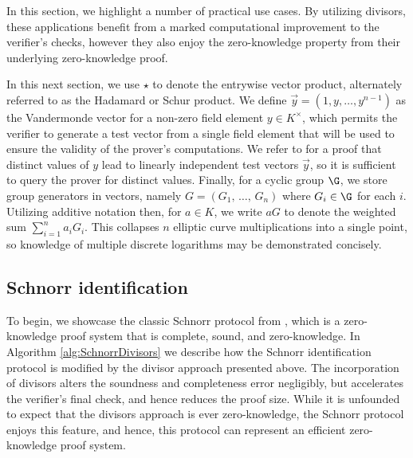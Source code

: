 \documentclass[11pt,letterpaper]{article}
\theoremstyle{definition}
\newcommand{\6}{\mathbf}
\newcommand{\7}{\mathcal}
\newcommand{\lsamp}{\xleftarrow{\$}}
\begin{document}
In this section, we highlight a number of practical use cases. By utilizing divisors, these applications benefit from a marked computational improvement to the verifier's checks, however they also enjoy the zero-knowledge property from their underlying zero-knowledge proof.

In this next section, we use $\star$ to denote the entrywise vector product, alternately referred to as the Hadamard or Schur product. 
We define $\vec{y} = (1, y, \dots, y^{n-1})$ as the Vandermonde vector for a non-zero field element $y \in K^\times$, which permits the verifier to generate a test vector from a single field element that will be used to ensure the validity of the prover's computations.  
We refer to \cite{HammR} for a proof that distinct values of $y$ lead to linearly independent test vectors $\vec{y}$, so it is sufficient to query the prover for distinct values.
Finally, for a cyclic group $\G$, we store group generators in vectors, namely $G = (G_1, \, \dots, \, G_n)$ where $G_i \in \G$ for each $i$.
Utilizing additive notation then, for $a \in K$, we write $a G$ to denote the weighted sum $\sum_{i=1}^n a_i G_i$. 
This collapses $n$ elliptic curve multiplications into a single point, so knowledge of multiple discrete logarithms may be demonstrated concisely.







\subsection{Schnorr identification}

To begin, we showcase the classic Schnorr protocol from \cite{Schnorr}, which is a zero-knowledge proof system that is complete, sound, and zero-knowledge.
In Algorithm \ref{alg:SchnorrDivisors} we describe how the Schnorr identification protocol is modified by the divisor approach presented above.
The incorporation of divisors alters the soundness and completeness error negligibly, but accelerates the verifier's final check, and hence reduces the proof size. 
While it is unfounded to expect that the divisors approach is ever zero-knowledge, the Schnorr protocol enjoys this feature, and hence, this protocol can represent an efficient zero-knowledge proof system.
\end{document}
